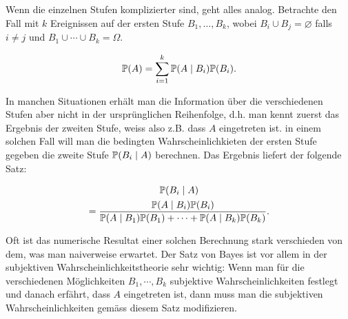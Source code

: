 Wenn die einzelnen Stufen komplizierter sind, geht alles analog. Betrachte den Fall mit $k$ Ereignissen auf der ersten Stufe $B_1,\ldots,B_k$, wobei $B_i\cup B_j=\varnothing$ falls $i\neq j$ und $B_1\cup \cdots \cup B_k=\Omega$.
\begin{satz}
	\begin{gather*}
		\mathbb P(A)=\sum_{i=1}^{k}\mathbb P(A\mid B_i)\mathbb P(B_i).
	\end{gather*}
\end{satz}
In manchen Situationen erhält man die Information über die verschiedenen Stufen aber nicht in der ursprünglichen Reihenfolge, d.h. man kennt zuerst das Ergebnis der zweiten Stufe, weiss also z.B. dass $A$ eingetreten ist. in einem solchen Fall will man die bedingten Wahrscheinlichkieten der ersten Stufe gegeben die zweite Stufe $\mathbb P(B_i\mid A)$ berechnen. Das Ergebnis liefert der folgende Satz:
\begin{satz}
	\begin{multline*}
		\mathbb P(B_i\mid A)\\=\frac{\mathbb P(A\mid B_i)\mathbb P(B_i)}{\mathbb P(A\mid B_1)\mathbb P(B_1)+ \cdots+ \mathbb P(A\mid B_k)\mathbb P(B_k)}.
	\end{multline*}
\end{satz}
Oft ist das numerische Resultat einer solchen Berechnung stark verschieden von dem, was man naiverweise erwartet. Der Satz von Bayes ist vor allem in der subjektiven Wahrscheinlichkeitstheorie sehr wichtig: Wenn man für die verschiedenen Möglichkeiten $B_1,\cdots,B_k$ subjektive Wahrscheinlichkeiten festlegt und danach erfährt, dass $A$ eingetreten ist, dann muss man die subjektiven Wahrscheinlichkeiten gemäss diesem Satz modifizieren.
